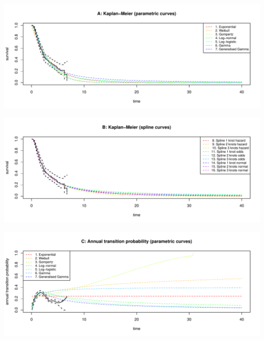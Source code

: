 \documentclass[]{article}
\begin{document}
\begin{flushleft}\includegraphics[height=0.29\textheight]{Images/validate_extrapolation3-1} \end{flushleft}

\begin{flushleft}\includegraphics[height=0.29\textheight]{Images/validate_extrapolation3-2} \end{flushleft}

\begin{flushleft}\includegraphics[height=0.29\textheight]{Images/validate_extrapolation3-3} \end{flushleft}
\end{document}
